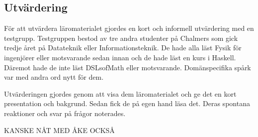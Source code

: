 \begin{draft}

\section{Utvärdering}


För att utvärdera läromaterialet gjordes en kort och informell utvärdering med en testgrupp. Testgruppen bestod av tre andra studenter på Chalmers som gick tredje året på Datateknik eller Informationsteknik. De hade alla läst Fysik för ingenjörer eller motsvarande sedan innan och de hade läst en kurs i Haskell. Däremot hade de inte läst DSLsofMath eller motsvarande. Domänspecifika spårk var med andra ord nytt för dem.

Utvärderingen gjordes genom att visa dem läromaterialet och ge det en kort presentation och bakgrund. Sedan fick de på egen hand läsa det. Deras spontana reaktioner och svar på frågor noterades.

KANSKE NÅT MED ÅKE OCKSÅ

\end{draft}

































